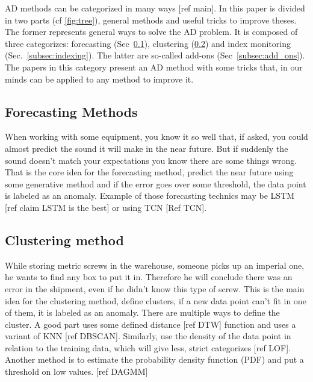 \documentclass[../../main/main.tex]{subfiles}
\begin{document}
    \begin{figure*}[hp]
        \makebox[\textwidth]{}
        \caption{Anomaly detection method categorization}
        \label{fig:tree}
    \end{figure*}

    \ac{AD} methods can be categorized in many ways [ref main]. In this paper is divided in two parts (cf \ref{fig:tree}),
    general methods and useful tricks to improve theses. The former represents general ways to 
    solve the \ac{AD} problem. It is composed of three categorizes: forecasting (Sec~\ref{subsec:forecasting}), clustering (\ref{subsec:clustering}) and index monitoring (Sec.~\ref{subsec:indexing}).
    The latter are so-called add-ons (Sec~\ref{subsec:add_ons}). The papers in this category present an \ac{AD} method with some tricks that,
    in our minds can be applied to any method to improve it.
    \subsection{Forecasting Methods}\label{subsec:forecasting}
        When working with some equipment, you know it so well that, if asked, you could almost 
        predict the sound it will make in the near future. But if suddenly the sound doesn't match 
        your expectations you know there are some things wrong.
        That is the core idea for the forecasting method, predict the near future using some generative method
        and if the error goes over some threshold, the data point is labeled as an anomaly. Example of those forecasting technics
        may be \ac{LSTM} [ref claim LSTM is the best] or using \ac{TCN} [Ref TCN].
    
    \subsection{Clustering method}\label{subsec:clustering}
        While storing metric screws in the warehouse, someone picks up an imperial one, he wants to find any box to put it in.
        Therefore he will conclude there was an error in the shipment, even if he didn't know this type of screw. This is the main 
        idea for the clustering method, define clusters, if a new data point can't fit in one of them, it is labeled as an anomaly.
        There are multiple ways to define the cluster. A good part uses some defined distance [ref DTW] function and uses a variant of \ac{KNN}
        [ref DBSCAN]. Similarly, use the density of the data point in relation to the training data, which will 
        give less, strict categorizes [ref LOF]. Another method is to estimate the probability density function (PDF) 
        and put a threshold on low values. [ref DAGMM]
    
\end{document}

